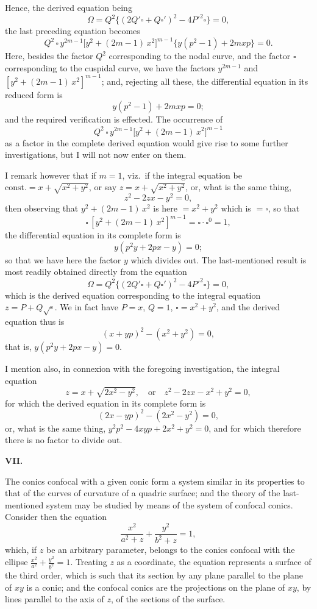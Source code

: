 \documentclass[11pt,a4paper]{article}
\theoremstyle{plain}
\begin{document}
\newpage
Hence, the derived equation being
\[
\Omega = Q^2\bigl\{(2Q'\square + Q\square')^2 - 4P'^2\square\bigr\} = 0,
\]
the last preceding equation becomes
\[
Q^2\,\square\,y^{2m-1}\bigl[y^2 + (2m - 1)\,x^2\bigr]^{m-1}\{y(p^2 - 1) + 2mxp\} = 0.
\]
Here, besides the factor $Q^2$ corresponding to the nodal curve, and the factor $\square$ corresponding to the cuspidal curve, we have the factors $y^{2m-1}$ and $[y^2 + (2m - 1)\,x^2]^{m-1}$; and, rejecting all these, the differential equation in its reduced form is
\[
y(p^2 - 1) + 2mxp = 0;
\]
and the required verification is effected. The occurrence of
\[
Q^2\,\square\,y^{2m-1}\bigl[y^2 + (2m - 1)\,x^2\bigr]^{m-1}
\]
as a factor in the complete derived equation would give rise to some further investigations, but I will not now enter on them.

I remark however that if $m = 1$, viz.\ if the integral equation be $\text{const.} = x + \sqrt{x^2 + y^2}$, or say $z = x + \sqrt{x^2 + y^2}$, or, what is the same thing,
\[
z^2 - 2zx - y^2 = 0,
\]
then observing that $y^2 + (2m - 1)\,x^2$ is here $= x^2 + y^2$ which is $= \square$, so that
\[
\square\,[y^2 + (2m - 1)\,x^2]^{m-1} = \square\cdot\square^0 = 1,
\]
the differential equation in its complete form is
\[
y(p^2 y + 2px - y) = 0;
\]
so that we have here the factor $y$ which divides out. The last-mentioned result is most readily obtained directly from the equation
\[
\Omega = Q^2\bigl\{(2Q'\square + Q\square')^2 - 4P'^2\square\bigr\} = 0,
\]
which is the derived equation corresponding to the integral equation $z = P + Q\sqrt{\square}$. We in fact have $P = x$, $Q = 1$, $\square = x^2 + y^2$, and the derived equation thus is
\[
(x + yp)^2 - (x^2 + y^2) = 0,
\]
that is, $y(p^2 y + 2px - y) = 0$.

I mention also, in connexion with the foregoing investigation, the integral equation
\[
z = x + \sqrt{2x^2 - y^2},\quad \text{or}\quad z^2 - 2zx - x^2 + y^2 = 0,
\]
for which the derived equation in its complete form is
\[
(2x - yp)^2 - (2x^2 - y^2) = 0,
\]
or, what is the same thing, $y^2 p^2 - 4xyp + 2x^2 + y^2 = 0$, and for which therefore there is no factor to divide out.

\bigskip
\begin{center}\textbf{VII.}\end{center}

The conics confocal with a given conic form a system similar in its properties to that of the curves of curvature of a quadric surface; and the theory of the last-mentioned system may be studied by means of the system of confocal conics. Consider then the equation
\[
\frac{x^2}{a^2 + z} + \frac{y^2}{b^2 + z} = 1,
\]
which, if $z$ be an arbitrary parameter, belongs to the conics confocal with the ellipse
$\frac{x^2}{a^2} + \frac{y^2}{b^2} = 1$. Treating $z$ as a coordinate, the equation represents a surface of the third order, which is such that its section by any plane parallel to the plane of $xy$ is a conic; and the confocal conics are the projections on the plane of $xy$, by lines parallel to the axis of $z$, of the sections of the surface.
\end{document}
